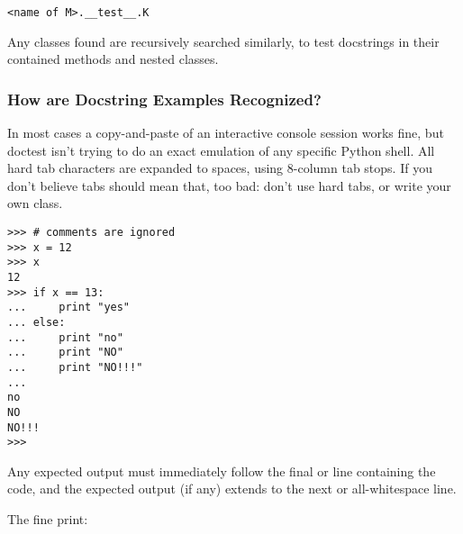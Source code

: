 \begin{verbatim}
<name of M>.__test__.K
\end{verbatim}

Any classes found are recursively searched similarly, to test docstrings in
their contained methods and nested classes.


\subsubsection{How are Docstring Examples
               Recognized?\label{doctest-finding-examples}}

In most cases a copy-and-paste of an interactive console session works
fine, but doctest isn't trying to do an exact emulation of any specific
Python shell.  All hard tab characters are expanded to spaces, using
8-column tab stops.  If you don't believe tabs should mean that, too
bad:  don't use hard tabs, or write your own 
class.


\begin{verbatim}
>>> # comments are ignored
>>> x = 12
>>> x
12
>>> if x == 13:
...     print "yes"
... else:
...     print "no"
...     print "NO"
...     print "NO!!!"
...
no
NO
NO!!!
>>>
\end{verbatim}

Any expected output must immediately follow the final
 or  line containing the code, and
the expected output (if any) extends to the next 
or all-whitespace line.

The fine print:

